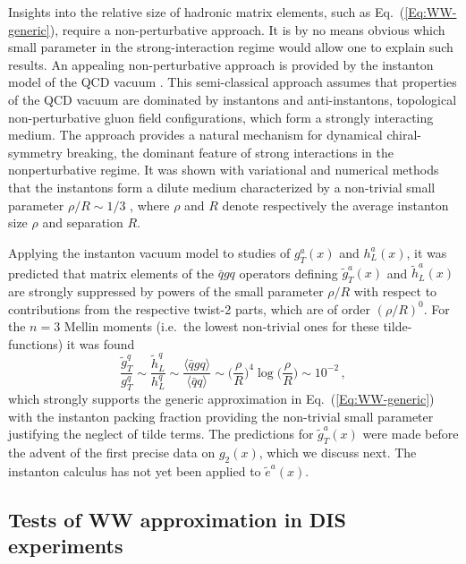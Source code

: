 \documentclass[a4paper,11pt]{article}
\newcommand{\be}{\begin{equation}}
\newcommand{\ee}{\end{equation}}
\newcommand{\la}{\langle}
\newcommand{\ra}{\rangle}
\begin{document}
Insights into the relative size of hadronic matrix elements, such as
Eq.~(\ref{Eq:WW-generic}), require a non-perturbative approach. It is
by no means obvious which small parameter in the strong-interaction
regime would allow one to explain such results. An appealing
non-perturbative approach is provided by the instanton model of
the QCD vacuum \cite{Shuryak:1981ff,Diakonov:1983hh,Diakonov:1995qy}.
This semi-classical approach assumes that properties of the QCD vacuum
are dominated by instantons and anti-instantons, topological non-perturbative
gluon field configurations, which form a strongly interacting medium.
The approach provides a natural mechanism for dynamical chiral-symmetry
breaking, the dominant feature of strong interactions in the nonperturbative
regime. It was shown with variational and numerical methods that the
instantons form a dilute medium characterized by a non-trivial small parameter
$\rho/R\sim1/3$ \cite{Shuryak:1981ff,Diakonov:1983hh,Diakonov:1995qy},
where $\rho$ and $R$ denote respectively the average instanton size $\rho$
and separation $R$.

Applying the instanton vacuum model to studies of $g_T^a(x)$ and $h_L^a(x)$,
it was predicted that matrix elements of the $\bar{q}gq$ operators defining
$\tilde{g}_T^a(x)$ \cite{Balla:1997hf} and $\tilde{h}_L^a(x)$
\cite{Dressler:1999hc} are strongly suppressed by powers of the small
parameter $\rho/R$ with respect to contributions from the
respective twist-2 parts, which are of order $(\rho/R)^0$.
For the $n = 3$ Mellin moments (i.e.\ the lowest non-trivial ones for 
these tilde-functions) it was found \cite{Balla:1997hf,Dressler:1999hc}
\be\label{Eq:WW-instanoton}
	\frac{\tilde{g}_T^q}{g_T^q} \sim \frac{\tilde{h}_L^q}{h_L^q}
	\sim \frac{\la\bar{q}gq\ra}{\la\bar{q}q\ra} \sim
	\biggl(\frac{\rho}{R}\biggr)^{\!4} \log\biggl(\frac{\rho}{R}\biggr)
	\sim 10^{-2} \, ,
\ee
which strongly supports the generic approximation
in Eq.~(\ref{Eq:WW-generic}) with the instanton packing fraction providing
the non-trivial small parameter justifying the neglect of tilde terms.
The predictions for $\tilde{g}_T^a(x)$ \cite{Balla:1997hf}
were made before the advent of the first precise data on $g_2(x)$,
which we discuss next.
The instanton calculus has not yet been applied to $\tilde{e}^a(x)$.


%
\subsection{Tests of WW approximation in DIS experiments}
\label{Sec-3.4:WW-classic-experiment}
\end{document}
